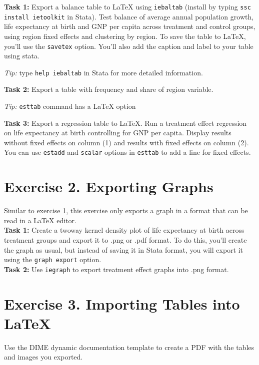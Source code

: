 \documentclass[12pts]{report}
\begin{document}
\textbf{Task 1:}  Export a balance table to {\LaTeX} using \texttt{iebaltab} (install by typing \texttt{ssc install ietoolkit} in Stata). Test balance of average annual population growth, life expectancy at birth and GNP per capita across treatment and control groups, using region fixed effects and clustering by region. To save the table to {\LaTeX}, you'll use the \texttt{savetex} option. You'll also add the caption and label to your table using stata. 
\begin{center}
	\textcolor{BurntOrange}{\emph{Tip:} type \texttt{help iebaltab} in Stata for more detailed information.}
\end{center}


\textbf{Task 2:}  Export a table with frequency and share of region variable. 
\begin{center}
	\textcolor{BurntOrange}{\emph{Tip:} \texttt{esttab} command has a {\LaTeX} option}
\end{center}

\textbf{Task 3:} Export a regression table to {\LaTeX}. Run a treatment effect regression on life expectancy at birth controlling for GNP per capita. Display results without fixed effects on column (1) and results with fixed effects on column (2). You can use \texttt{estadd} and \texttt{scalar} options in \texttt{esttab} to add a line for fixed effects.

\section*{Exercise 2. Exporting Graphs}
Similar to exercise 1, this exercise only exports a graph in a format that can be read in a {\LaTeX} editor. \\

\textbf{Task 1:}  Create a twoway kernel density plot of life expectancy at birth across treatment groups and export it to .png or .pdf format. To do this, you'll create the graph as usual, but instead of saving it in Stata format, you will export it using the \texttt{graph export} option. \\

\textbf{Task 2:}  Use \texttt{iegraph} to export treatment effect graphs into .png format.

\section*{Exercise 3. Importing Tables into \LaTeX}
Use the DIME dynamic documentation template to create a PDF with the tables and images you exported.\\
\end{document}
